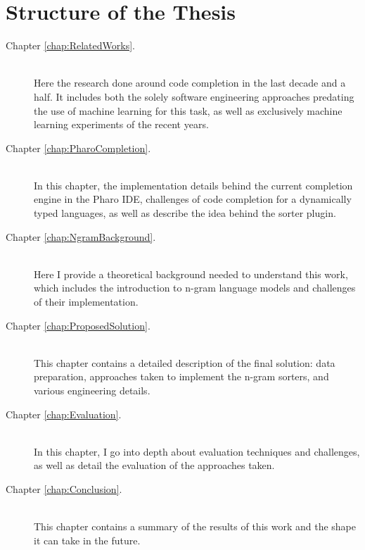 \section{Structure of the Thesis}
\label{sec:Introduction-Structure}
{\hypersetup{linkcolor=black}
\begin{description}
	\item [Chapter \ref{chap:RelatedWorks}. ] \hfill \\
	Here  the research done around code completion in the last decade and a half. It includes both the solely software engineering approaches predating the use of machine learning for this task, as well as exclusively machine learning experiments of the recent years.
    \item [Chapter \ref{chap:PharoCompletion}. ] \hfill \\
	In this chapter,  the implementation details behind the current completion engine in the Pharo IDE, challenges of code completion for a dynamically typed languages, as well as describe the idea behind the sorter plugin.
	\item [Chapter \ref{chap:NgramBackground}. ] \hfill \\
    Here I provide a theoretical background needed to understand this work, which includes the introduction to n-gram language models and challenges of their implementation.
    \item [Chapter \ref{chap:ProposedSolution}. ] \hfill \\
	This chapter contains a detailed description of the final solution: data preparation, approaches taken to implement the n-gram sorters, and various engineering details.
	\item [Chapter \ref{chap:Evaluation}. ] \hfill \\
    In this chapter, I go into depth about evaluation techniques and challenges, as well as detail the evaluation of the approaches taken.
    \item [Chapter \ref{chap:Conclusion}. ] \hfill \\
	This chapter contains a summary of the results of this work and the shape it can take in the future.
\end{description}
}